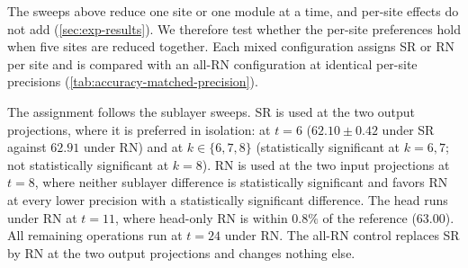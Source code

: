 The sweeps above reduce one site or one module at a time, and per-site effects
do not add (\cref{sec:exp-results}). We therefore test whether the per-site
preferences hold when five sites are reduced together. Each mixed configuration
assigns SR or RN per site and is compared with an all-RN configuration at
identical per-site precisions (\cref{tab:accuracy-matched-precision}).

The assignment follows the sublayer sweeps. SR is used at the two output
projections, where it is preferred in isolation:  at $t=6$
($62.10\pm0.42$ under SR against $62.91$ under RN) and  at
$k\in\{6,7,8\}$ (statistically significant at $k=6,7$; not statistically
significant at $k=8$). RN is used at the two input projections at $t=8$, where
neither sublayer difference is statistically significant and
 favors RN at every lower precision with a statistically
significant difference. The head runs under RN at $t=11$, where head-only RN is
within $0.8\%$ of the reference ($63.00$). All remaining operations run at
$t=24$ under RN. The all-RN control replaces SR by RN at the two output
projections and changes nothing else.

